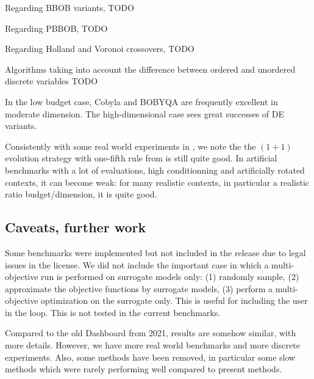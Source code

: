Regarding BBOB variants, TODO

Regarding PBBOB, TODO

Regarding Holland and Voronoi crossovers, TODO

Algorithms taking into account the difference between ordered and unordered discrete variables TODO

In the low budget case, Cobyla and BOBYQA are frequently excellent in moderate dimension. The high-dimensional case sees great successes of DE variants.

Consistently with some real world experiments in \cite{micropredictions1,micropredictions2}, we note the the $(1+1)$ evolution strategy with one-fifth rule from \cite{rechenberg73} is still quite good. In artificial benchmarks with a lot of evaluations, high conditionning and artificially rotated contexts, it can become weak: for many realistic contexts, in particular a realistic ratio budget/dimension, it is quite good.

\subsection{Caveats, further work}
Some benchmarks were implemented but not included in the release due to legal issues in the license. 
We did not include the important case in which a multi-objective run is performed on surrogate models only: (1) randomly sample, (2) approximate the objective functions by surrogate models, (3) perform a multi-objective optimization on the surrogate only. This is useful for including the user in the loop. This is not tested in the current benchmarks.

Compared to the old Dashboard from 2021, results are somehow similar, with more details. However, we have more real world benchmarks and more discrete experiments. Also,
some methods have been removed, in particular some slow methods which were rarely performing well compared to present methods.

